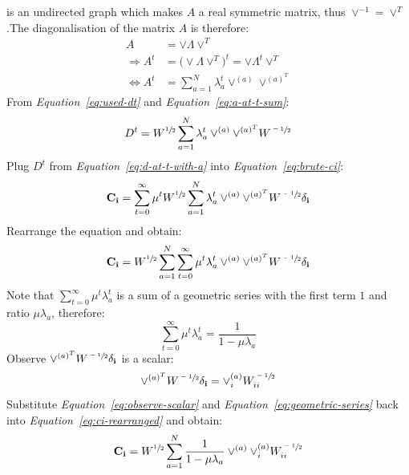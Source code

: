 \documentclass[12pt]{report}
\begin{document}
is an undirected graph which makes $A$ a real symmetric matrix, thus $\vee^{-1} = \vee^{T}$
\cite{eigval_and_eigvec}.The diagonalisation of the matrix $A$ is therefore:
%
\begin{align}
\label{eq:a-at-t-sum}
A &= \vee \Lambda \vee^{T} \\
\Rightarrow A^t &= \big(\vee \Lambda \vee^{T}\big)^t = \vee \Lambda^t \vee^{T} \\
\Leftrightarrow A^t &= \sum_{a=1}^{N} \lambda_a^t \vee^{(a)} \vee^{(a)^T}
\end{align}
%
From \emph{Equation~\ref{eq:used-dt}} and \emph{Equation~\ref{eq:a-at-t-sum}}:
\begin{equation}
\label{eq:d-at-t-with-a}
D^t = W^{\sfrac{1}{2}} \sum_{a=1}^{N} \lambda_a^t \vee^{(a)} \vee^{(a)^T} W^{\sfrac{-1}{2}}
\end{equation}
%
%
Plug $D^t$ from \emph{Equation~\ref{eq:d-at-t-with-a}} into \emph{Equation~\ref{eq:brute-ci}}:
\begin{equation}
\mathbf{C_i} = \sum_{t=0}^\infty \mu^t W^{\sfrac{1}{2}} \sum_{a=1}^{N} \lambda_a^t \vee^{(a)} \vee^{(a)^T} W^{\sfrac{-1}{2}} \mathbf{\delta_i}
\end{equation}
Rearrange the equation and obtain:
\begin{equation}
\label{eq:ci-rearranged}
\mathbf{C_i} = W^{\sfrac{1}{2}} \sum_{a=1}^{N} \sum_{t=0}^\infty \mu^t  \lambda_a^t \vee^{(a)} \vee^{(a)^T} W^{\sfrac{-1}{2}} \mathbf{\delta_i}
\end{equation}
%
%
Note that $\sum_{t=0}^\infty \mu^t\lambda_a^t$ is a sum of a geometric series with
the first term $1$ and ratio $\mu \lambda_a$, therefore:
%
\begin{equation}
\label{eq:geometric-series}
\sum_{t=0}^\infty \mu^t\lambda_a^t = \frac{1}{1 - \mu \lambda_a}
\end{equation}
%
Observe $\vee^{(a)^T} W^{\sfrac{-1}{2}} \mathbf{\delta_i}$ is a scalar:
\begin{equation}
\label{eq:observe-scalar}
\vee^{(a)^T} W^{\sfrac{-1}{2}} \mathbf{\delta_i} = \vee^{(a)}_i W^{\sfrac{-1}{2}}_{ii}
\end{equation}
%
Substitute \emph{Equation~\ref{eq:observe-scalar}} and \emph{Equation~\ref{eq:geometric-series}}
back into \emph{Equation~\ref{eq:ci-rearranged}} and obtain:
%
\begin{equation}
\label{eq:ci-rearranged-geometric}
\mathbf{C_i} = W^{\sfrac{1}{2}} \sum_{a=1}^{N} \frac{1}{1 - \mu \lambda_a} \vee^{(a)} \vee^{(a)}_i W^{\sfrac{-1}{2}}_{ii}
\end{equation}
\end{document}
